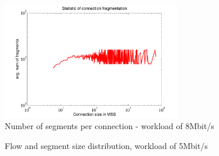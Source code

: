 \documentclass[preprint,12pt]{elsarticle}
\begin{document}
\begin{figure}[ht]
  \centering
  \includegraphics[width=0.7\textwidth]{./fig/wired/internal_dynamics/segment_8}
  \caption{Number of segments per connection - workload of 8Mbit/s}
  \label{fig:seg8}
\end{figure}

\begin{figure}[ht]
  \centering
  \caption{Flow and segment size distribution, workload of 5Mbit/s}
  \label{fig:flow_subflow}
\end{figure}
\end{document}
